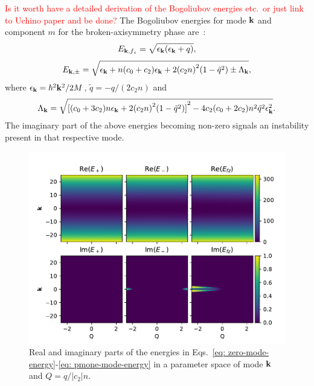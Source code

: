\textcolor{red}{Is it worth have a detailed derivation of the
    Bogoliubov energies etc.\ or just link to Uchino paper and be done?}
The Bogoliubov energies for mode \( \vb{k} \) and component \( m \) for the
broken-axisymmetry phase are~\cite{Uchino2010}:
\begin{equation}
    E_{\vb{k}, {f_z}} = \sqrt{\epsilon_{\vb{k}}(\epsilon_{\vb{k}} + q)},
    \label{eq: zero-mode-energy}
\end{equation}
\begin{equation}
    E_{{\vb{k}}, \pm} = \sqrt{\epsilon_{\vb{k}} + n(c_0 + c_2)\epsilon_{\vb{k}}
        + 2{(c_2n)}^2(1 - \tilde{q}^2) \pm \Lambda_{\vb{k}}},
    \label{eq: pmone-mode-energy}
\end{equation}
where \( \epsilon_{\vb{k}} = \hbar^2\vb{k}^2 / 2M \), \( \tilde{q} = -q/(2c_2n)\)
and
\begin{equation}
    \Lambda_{\vb{k}} = \sqrt{{[(c_0+3c_2)n\epsilon_{\vb{k}}
                        + 2{(c_2n)}^2(1-\tilde{q}^2)]}^2
        - 4c_2(c_0+2c_2)n^2\tilde{q}^2\epsilon_{\vb{k}}^2}.
\end{equation}
The imaginary part of the above energies becoming non-zero signals an
instability present in that respective mode.
\begin{figure}[tb]
    \centering
    \includegraphics[width=\textwidth]{gfx/ch-spin1/dens_spin_energies.pdf}
    \caption[Real and imaginary parts of the Bogoliubov energies for the
        broken-axisymmetry phase of a spin-1 BEC]
    {Real and imaginary parts of the energies in
        Eqs.~\eqref{eq: zero-mode-energy}-\eqref{eq: pmone-mode-energy} in a
        parameter space of mode \( \vb{k} \) and
        \( Q=q/|c_2|n \).\label{fig: dens-spin-energies}}
\end{figure}
